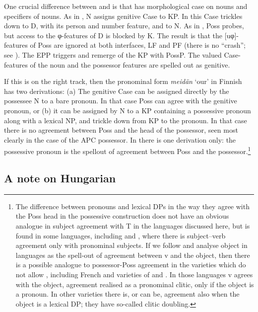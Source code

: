 \documentclass[output=paper]{langsci/langscibook}
\begin{document}
One crucial difference between  and  is that  has
morphological case on nouns and specifiers of nouns. As in , N assigns
genitive Case to KP. In  this Case trickles down to D, with its person
and number feature, and to N. As in , Poss probes, but access to the
φ-features of D is blocked by K. The result is that the [uφ]-features of Poss
are ignored at both interfaces, LF and PF (there is no \enquote{crash}; see
\citealt{Preminger2014}). The \gls{EPP}
triggers  and remerge of the KP with PossP. The valued Case-features of
the noun and the possessor features are spelled out as genitive.

If this is on the right track, then the pronominal form \emph{meidän} `our' in
Finnish has two derivations: (a) The genitive Case can be assigned directly by
the possessee N to a bare pronoun. In that case Poss can agree with the
genitive pronoun, or (b) it can be assigned by N to a KP containing a
possessive pronoun along with a lexical NP, and trickle down from KP to the
pronoun. In that case there is no agreement between Poss and the head of the
possessor, seen most clearly in the case of the \gls{APC} possessor. In 
there is one derivation only: the possessive pronoun is the spellout of
agreement between Poss and the possessor.\footnote{The difference between
pronouns and lexical DPs in the way they agree with the Poss head in the
possessive construction does not have an obvious analogue in subject
agreement
with T in the languages discussed here, but is found in some languages,
including  and , where there is subject--verb
agreement only with
pronominal subjects. If we follow \citet[128--139]{Roberts2010} and analyse
object  in  languages as the spell-out of agreement between v and
the object, then there is a possible analogue to possessor-Poss agreement in
the  varieties which do not allow , including French and
varieties of  and . In those languages v agrees with the object,
agreement realised as a pronominal clitic, only if the object is a pronoun. In
other varieties there is, or can be, agreement also when the object is a
lexical DP; they have so-called clitic doubling.}

\subsection{A note on Hungarian}\label{sec:16.3.4}
\end{document}

